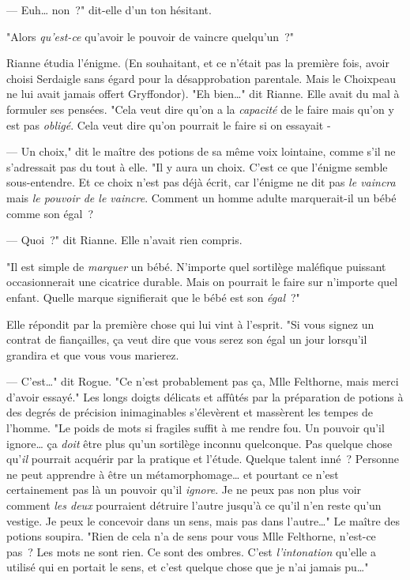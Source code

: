 --- Euh… non~?" dit-elle d'un ton hésitant.

"Alors \emph{qu'est-ce} qu'avoir le pouvoir de vaincre quelqu'un~?"

Rianne étudia l'énigme. (En souhaitant, et ce n'était pas la première fois, avoir choisi Serdaigle sans égard pour la désapprobation parentale. Mais le Choixpeau ne lui avait jamais offert Gryffondor). "Eh bien…" dit Rianne. Elle avait du mal à formuler ses pensées. "Cela veut dire qu'on a la \emph{capacité} de le faire mais qu'on y est pas \emph{obligé}. Cela veut dire qu'on pourrait le faire si on essayait -

--- Un choix," dit le maître des potions de sa même voix lointaine, comme s'il ne s'adressait pas du tout à elle. "Il y aura un choix. C'est ce que l'énigme semble sous-entendre. Et ce choix n'est pas déjà écrit, car l'énigme ne dit pas \emph{le vaincra} mais \emph{le pouvoir de le vaincre}. Comment un homme adulte marquerait-il un bébé comme son égal~?

--- Quoi~?" dit Rianne. Elle n'avait rien compris.

"Il est simple de \emph{marquer} un bébé. N'importe quel sortilège maléfique puissant occasionnerait une cicatrice durable. Mais on pourrait le faire sur n'importe quel enfant. Quelle marque signifierait que le bébé est son \emph{égal}~?"

Elle répondit par la première chose qui lui vint à l'esprit. "Si vous signez un contrat de fiançailles, ça veut dire que vous serez son égal un jour lorsqu'il grandira et que vous vous marierez.

--- C'est…" dit Rogue. "Ce n'est probablement pas ça, Mlle Felthorne, mais merci d'avoir essayé." Les longs doigts délicats et affûtés par la préparation de potions à des degrés de précision inimaginables s'élevèrent et massèrent les tempes de l'homme. "Le poids de mots si fragiles suffit à me rendre fou. Un pouvoir qu'il ignore… ça \emph{doit} être plus qu'un sortilège inconnu quelconque. Pas quelque chose qu'\emph{il} pourrait acquérir par la pratique et l'étude. Quelque talent inné~? Personne ne peut apprendre à être un métamorphomage… et pourtant ce n'est certainement pas là un pouvoir qu'il \emph{ignore}. Je ne peux pas non plus voir comment \emph{les deux} pourraient détruire l'autre jusqu'à ce qu'il n'en reste qu'un vestige. Je peux le concevoir dans un sens, mais pas dans l'autre…" Le maître des potions soupira. "Rien de cela n'a de sens pour vous Mlle Felthorne, n'est-ce pas~? Les mots ne sont rien. Ce sont des ombres. C'est \emph{l'intonation} qu'elle a utilisé qui en portait le sens, et c'est quelque chose que je n'ai jamais pu…"

